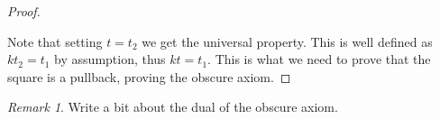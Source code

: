 \documentclass[12pt]{article}
\theoremstyle{definition}
\theoremstyle{remark}
\newtheorem*{remark}{Remark}
\begin{document}
\begin{proof}
\begin{center}
                \end{center}
                Note that setting $t=t_2$ we get the universal property. This is well defined as $kt_2=t_1$ by assumption, thus $kt=t_1$. This is what we need to prove that the square is a pullback, proving the obscure axiom.
            \end{proof}

            \begin{remark}
                Write a bit about the dual of the obscure axiom.
            \end{remark}
\end{document}

